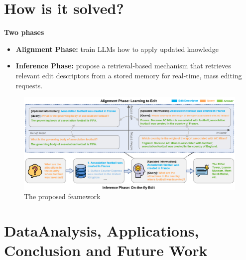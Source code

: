 \documentclass{article}
\begin{document}
\section{How is it solved?}
\textbf{Two phases}
\begin{itemize}
    \item \textbf{Alignment Phase:} train LLMs how to apply updated knowledge
    \item \textbf{Inference Phase:} propose a retrieval-based mechanism that retrieves relevant edit descriptors from a stored memory for real-time, mass editing requests.
\end{itemize}

\begin{figure}[H]
    \centering
    \includegraphics[width=\textwidth]{./../Images/Figure2.png}
    \caption{The proposed feamework}
\end{figure}


\section{DataAnalysis, Applications, Conclusion and Future Work}
\end{document}
